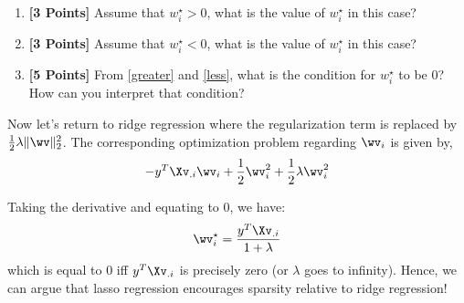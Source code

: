 \begin{enumerate}
\begin{enumerate}
\item {\bf [3 Points]} Assume that $w_i^\star > 0$, what is the value of $w_i^\star$ in this case? \label{greater}

\begin{tcolorbox}[fit,height=5cm,width=.95\textwidth,blank,borderline={1pt}{-2pt},nobeforeafter]

\end{tcolorbox}

\item {\bf [3 Points]} Assume that $w_i^\star < 0$, what is the value of $w_i^\star$ in this case? \label{less}

\begin{tcolorbox}[fit,height=5cm,width=.95\textwidth,blank,borderline={1pt}{-2pt},nobeforeafter]

\end{tcolorbox}

\newpage
\item {\bf [5 Points]} From \ref{greater} and \ref{less}, what is the condition for $w_i^\star$ to be 0? How can you interpret that condition? \label{lasso_cond}

\begin{tcolorbox}[fit,height=18cm,width=.95\textwidth,blank,borderline={1pt}{-2pt},nobeforeafter]

\end{tcolorbox}
\end{enumerate}

\clearpage 

Now let's return to ridge regression where the regularization term is replaced by $\frac{1}{2}\lambda\|\wv\|_2^2$. The corresponding optimization problem regarding $\wv_i$ is given by,
$$-y^T\Xv_{.i}\wv_i + \frac{1}{2} \wv^2_i + \frac{1}{2} \lambda \wv^2_i$$

Taking the derivative and equating to 0, we have:
$$\wv^\star_i = \frac{y^T\Xv_{.i}}{1 + \lambda}$$
which is equal to 0 iff $y^T\Xv_{.i}$ is precisely zero (or $\lambda$ goes to infinity). Hence, we can argue that lasso regression encourages sparsity relative to ridge regression!

\end{enumerate}
